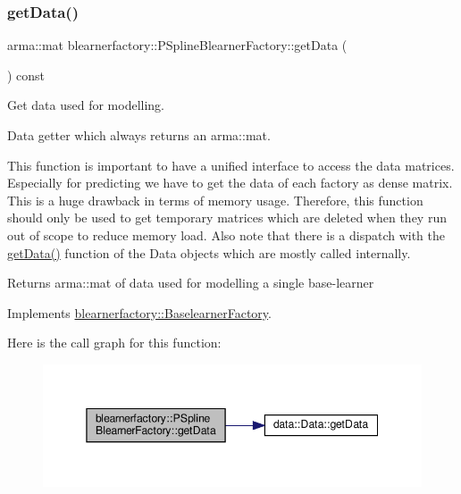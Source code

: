 \subsubsection{\texorpdfstring{get\+Data()}{getData()}}
{\footnotesize\ttfamily arma\+::mat blearnerfactory\+::\+P\+Spline\+Blearner\+Factory\+::get\+Data (\begin{DoxyParamCaption}{ }\end{DoxyParamCaption}) const\hspace{0.3cm}{\ttfamily [virtual]}}



Get data used for modelling. 

Data getter which always returns an arma\+::mat.

This function is important to have a unified interface to access the data matrices. Especially for predicting we have to get the data of each factory as dense matrix. This is a huge drawback in terms of memory usage. Therefore, this function should only be used to get temporary matrices which are deleted when they run out of scope to reduce memory load. Also note that there is a dispatch with the \hyperlink{classblearnerfactory_1_1_p_spline_blearner_factory_a9363131f08b3b3c1c482786347d13f7c}{get\+Data()} function of the Data objects which are mostly called internally.

\begin{DoxyReturn}{Returns}
{\ttfamily arma\+::mat} of data used for modelling a single base-\/learner 
\end{DoxyReturn}


Implements \hyperlink{classblearnerfactory_1_1_baselearner_factory_aa3e4580bca870ca3b742dda6c820e1e6}{blearnerfactory\+::\+Baselearner\+Factory}.

Here is the call graph for this function\+:
\nopagebreak
\begin{figure}[H]
\begin{center}
\leavevmode
\includegraphics[width=345pt]{classblearnerfactory_1_1_p_spline_blearner_factory_a9363131f08b3b3c1c482786347d13f7c_cgraph}
\end{center}
\end{figure}
\mbox{\label{classblearnerfactory_1_1_p_spline_blearner_factory_a290a1c60224d027059939a895b474aa1}} 

